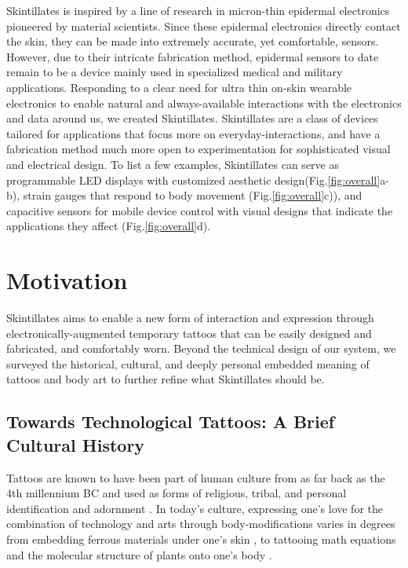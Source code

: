 \documentclass{sigchi}
\begin{document}
Skintillates is inspired by a line of research in micron-thin epidermal electronics pioneered by material scientists. Since these epidermal electronics directly contact the skin, they can be made into extremely accurate, yet comfortable, sensors. However, due to their intricate fabrication method, epidermal sensors to date remain to be a device mainly used in specialized medical and military applications. Responding to a clear need for ultra thin on-skin wearable electronics to enable natural and always-available interactions with the electronics and data around us\cite{MunehikoSato:2012we,chris:2011ve,ChrisHarrison:2010vi,DavidKim:2012uu,Harrison:2014ft,Laput:2014du}, we created Skintillates. Skintillates are a class of devices tailored for applications that focus more on everyday-interactions, and have a fabrication method much more open to experimentation for sophisticated visual and electrical design. To list a few examples, Skintillates can serve as programmable LED displays with customized aesthetic design(Fig.\ref{fig:overall}a-b), strain gauges that respond to body movement (Fig.\ref{fig:overall}c)), and capacitive sensors for mobile device control with visual designs that indicate the applications they affect (Fig.\ref{fig:overall}d). 

\section{Motivation}
Skintillates aims to enable a new form of interaction and expression through electronically-augmented temporary tattoos that can be easily designed and fabricated, and comfortably worn. Beyond the technical design of our system, we surveyed the historical, cultural, and deeply personal embedded meaning of tattoos and body art to further refine what Skintillates should be.

\subsection{Towards Technological Tattoos: A Brief Cultural History}

Tattoos are known to have been part of human culture from as far back as the 4th millennium BC and used as forms of religious,  tribal, and personal  identification  and adornment \cite{Grognard:o1z3U5M2}. In today's culture, expressing  one's  love  for the combination of technology and arts through body-modifications varies in degrees from  embedding  ferrous  materials  under one’s skin \cite{Norton:OK5Z52w0}, to tattooing math equations and the molecular structure of plants onto one's body \cite{Zimmer:2011wb}. 
\end{document}
